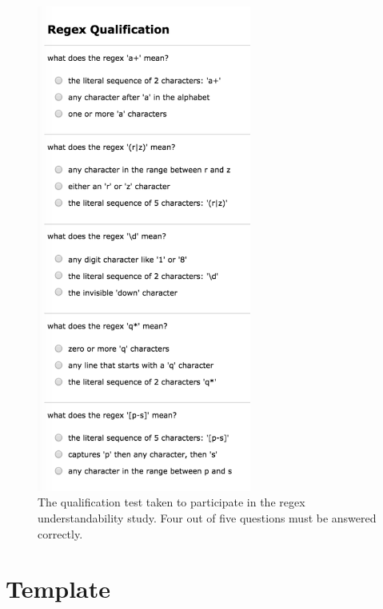 \begin{figure}[!htbp]
\centering
\includegraphics[height=16cm,keepaspectratio]{nontex/qualificationTest}
\vspace{-12pt}
\caption{The qualification test taken to participate in the regex understandability study.  Four out of five questions must be answered correctly.}
\vspace{-6pt}
\label{fig:qualTest}
\end{figure}

\pagebreak
\section*{Template}
\label{app:MTtemplate}

